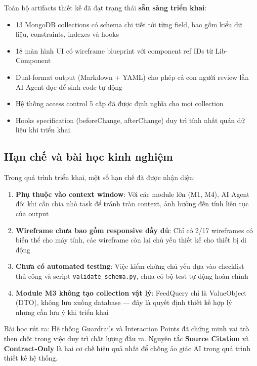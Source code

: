 \documentclass[13pt,a4paper,oneside]{extreport}
\numberwithin{equation}{chapter}
\numberwithin{figure}{chapter}
\numberwithin{table}{chapter}
\begin{document}
Toàn bộ artifacts thiết kế đã đạt trạng thái \textbf{sẵn sàng triển khai}:

\begin{itemize}
    \item 13 MongoDB collections có schema chi tiết tới từng field, bao gồm kiểu dữ liệu, constraints, indexes và hooks
    \item 18 màn hình UI có wireframe blueprint với component ref IDs từ Lib-Component
    \item Dual-format output (Markdown + YAML) cho phép cả con người review lẫn AI Agent đọc để sinh code tự động
    \item Hệ thống access control 5 cấp đã được định nghĩa cho mọi collection
    \item Hooks specification (beforeChange, afterChange) duy trì tính nhất quán dữ liệu khi triển khai.
\end{itemize}

\subsection{Hạn chế và bài học kinh nghiệm}

Trong quá trình triển khai, một số hạn chế đã được nhận diện:

\begin{enumerate}
    \item \textbf{Phụ thuộc vào context window}: Với các module lớn (M1, M4), AI Agent đôi khi cần chia nhỏ task để tránh tràn context, ảnh hưởng đến tính liên tục của output
    \item \textbf{Wireframe chưa bao gồm responsive đầy đủ}: Chỉ có 2/17 wireframes có biến thể cho máy tính, các wireframe còn lại chủ yếu thiết kế cho thiết bị di động
    \item \textbf{Chưa có automated testing}: Việc kiểm chứng chủ yếu dựa vào checklist thủ công và script \texttt{validate\_schema.py}, chưa có bộ test tự động hoàn chỉnh
    \item \textbf{Module M3 không tạo collection vật lý}: FeedQuery chỉ là ValueObject (DTO), không lưu xuống database — đây là quyết định thiết kế hợp lý nhưng cần lưu ý khi triển khai
\end{enumerate}

Bài học rút ra: Hệ thống Guardrails và Interaction Points đã chứng minh vai trò then chốt trong việc duy trì chất lượng đầu ra. Nguyên tắc \textbf{Source Citation} và \textbf{Contract-Only} là hai cơ chế hiệu quả nhất để chống ảo giác AI trong quá trình thiết kế hệ thống.
\end{document}
